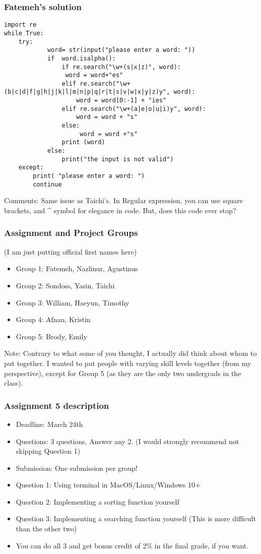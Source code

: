 \documentclass{beamer}
\begin{document}
\begin{frame}[fragile]
\frametitle{Fatemeh's solution}
\tiny
\begin{verbatim}
import re
while True:
    try:
            word= str(input("please enter a word: "))
            if  word.isalpha():
                if re.search("\w+(s|x|z)", word):
                 word = word+"es"
                elif re.search("\w+(b|c|d|f|g|h|j|k|l|m|n|p|q|r|t|s|v|w|x|y|z)y", word):
                    word = word[0:-1] + "ies"
                elif re.search("\w+(a|e|o|u|i)y", word):
                    word = word + "s"
                else:
                     word = word +"s"
                print (word)
            else:
                print("the input is not valid")
    except:
        print( "please enter a word: ")
        continue
\end{verbatim} \small
Comments: Same issue as Taichi's. In Regular expression, you can use square brackets, and \^{} symbol for elegance in code. But, does this code ever stop?
\end{frame}

\begin{frame}
\frametitle{Assignment and Project Groups}
(I am just putting official first names here)
\begin{itemize}
\item Group 1: Fatemeh, Nazlinur, Agustinus
\item Group 2: Sondoss, Yasin, Taichi
\item Group 3: William, Haeyun, Timothy
\item Group 4: Afnan, Kristin
\item Group 5: Brody, Emily
\end{itemize}
\footnotesize Note: Contrary to what some of you thought, I actually did think about whom to put together. I wanted to put people with varying skill levels together (from my perspective), except for Group 5 (as they are the only two undergrads in the class).
\end{frame}


\begin{frame}
\frametitle{Assignment 5 description}
\begin{itemize}
\item Deadline: March 24th
\item Questions: 3 questions, Answer any 2. (I would strongly recommend not skipping Question 1)
\item Submission: One submission per group! 
\item Question 1: Using terminal in MacOS/Linux/Windows 10+ 
\item Question 2: Implementing a sorting function yourself
\item Question 3: Implementing a searching function yourself (This is more difficult than the other two)
\item You can do all 3 and get bonus credit of 2\% in the final grade, if you want. 
\end{itemize}
\end{frame}
\end{document}
